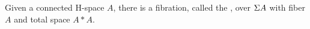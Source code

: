 \documentclass[hott-all.tex]{subfiles}
\begin{document}
% 
%
%
% 
%
%
%
%
% 
\begin{lem}
  Given a connected H-space $A$, there is a fibration, called the
  ,
  over $\Sigma A$ with fiber $A$ and total space $A*A$.
\end{lem}
% 
\end{document}
